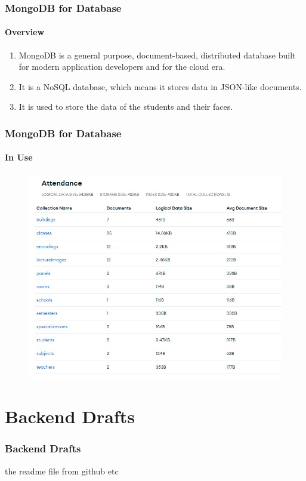 \documentclass[aspectratio=169]{beamer}
\begin{document}
\begin{frame}
	\centering
	\frametitle{MongoDB for Database}
	\framesubtitle{Overview}
	\begin{minipage}{0.95\textwidth}
		\begin{enumerate}
			\item MongoDB is a general purpose, document-based, distributed database built for modern application developers and for the cloud era.
			\item It is a NoSQL database, which means it stores data in JSON-like documents.
			\item It is used to store the data of the students and their faces.
		\end{enumerate}
	\end{minipage}
\end{frame}
\begin{frame}
	\centering
	\frametitle{MongoDB for Database}
	\framesubtitle{In Use}
	\begin{minipage}{0.95\textwidth}
		\begin{figure}[H]
			\centering
			\includegraphics[width=.85\textwidth]{mongo.jpg}
		\end{figure}
	\end{minipage}
\end{frame}


\section{Backend Drafts}
\begin{frame}
	\centering
	\frametitle{Backend Drafts}
	\begin{minipage}{0.95\textwidth}
		the readme file from github etc
	\end{minipage}
\end{frame}
\end{document}
